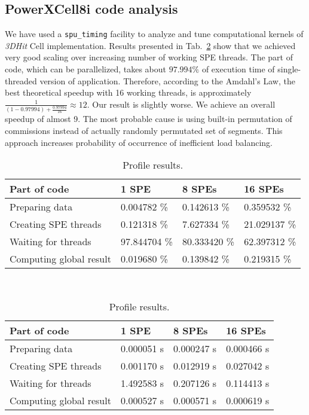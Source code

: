 \documentclass[envcountsame,envcountchap]{svmono}
\newcommand{\prog}{\emph{3DHit}}
\begin{document}
\subsection{PowerXCell8i code analysis}
We have used a \texttt{spu\_timing} facility to analyze and tune computational
kernels of \prog{} Cell implementation.
Results presented in Tab.~\ref{tab:t3} show that we achieved
very good scaling over increasing number of working SPE threads.
The part of code, which can be parallelized, takes about $97.994\%$ of execution
time of single-threaded version of application.
Therefore, according to the Amdahl's Law, the best theoretical speedup with 16
working threads, is approximately
$\frac{1}{(1-0.97994) + \frac{0.97994}{16}}\approx12$.
Our result is slightly worse.
We achieve an overall speedup of almost 9.
The most probable cause is using built-in permutation of commissions instead of
actually randomly permutated set of segments.
This approach increases probability of occurrence of inefficient load balancing.
\begin{table}[htb]
\begin{footnotesize}
\caption{Profile results.}
\label{tab:t3}
\newcommand{\m}{\hphantom{$-$}}
\newcommand{\cc}[1]{\multicolumn{1}{c}{#1}}
\renewcommand{\tabcolsep}{0.5pc} %
\renewcommand{\arraystretch}{1.2} %
\begin{tabular}{@{}llll}
\hline
\textbf{Part of code} & \textbf{1 SPE} & \textbf{8 SPEs} & \textbf{16 SPEs} \\
\hline
Preparing data & 0.004782 \% & 0.142613 \% & 0.359532 \% \\
Creating  SPE threads & 0.121318 \% & 7.627334 \% & 21.029137 \% \\
Waiting for threads & 97.844704 \% & 80.333420 \% & 62.397312 \% \\
Computing global result & 0.019680 \% & 0.139842 \% & 0.219315 \% \\
\hline
\end{tabular}\\[2pt]

\bigskip

\begin{tabular}{@{}llll}
\hline
\textbf{Part of code} & \textbf{1 SPE} & \textbf{8 SPEs} & \textbf{16 SPEs} \\
\hline
Preparing data & 0.000051 s & 0.000247 s & 0.000466 s \\
Creating  SPE threads & 0.001170 s & 0.012919 s & 0.027042 s \\
Waiting for threads & 1.492583 s & 0.207126 s & 0.114413 s \\
Computing global result & 0.000527 s & 0.000571 s & 0.000619 s \\
\hline
\end{tabular}\\[2pt]
\end{footnotesize}
\end{table}
\end{document}
